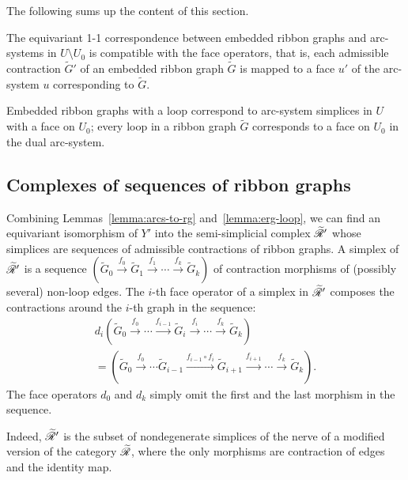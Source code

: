 The following sums up the content of this section.
\begin{lemma}
  \label{lemma:erg-loop}
  The equivariant 1-1 correspondence between embedded ribbon graphs
  and arc-systems in $U \setminus U_0$ is compatible with the face operators,
  that is, each admissible contraction ${\tilde G'}$ of an embedded
  ribbon graph ${\tilde G}$ is mapped to a face $u'$ of the arc-system
  $u$ corresponding to ${\tilde G}$.

  Embedded ribbon graphs with a loop correspond to arc-system simplices
  in $U$ with a face on $U_0$; every loop in a ribbon graph ${\tilde G}$
  corresponds to a face on $U_0$ in the dual arc-system.
\end{lemma}


\subsection{Complexes of sequences of ribbon graphs}
\label{sec:sequences}

Combining Lemmas~\ref{lemma:arcs-to-rg} and~\ref{lemma:erg-loop}, we
can find an equivariant isomorphism of $Y'$ into the semi-simplicial
complex $\mathscr{\widetilde R}_{}'$ whose simplices are sequences of admissible
contractions of ribbon graphs.  A simplex of $\mathscr{\widetilde R}_{}'$ is a sequence
$({\tilde G}_0 \overset{f_0}\to {\tilde G}_1 \overset{f_1}\to \cdots
\overset{f_k}\to {\tilde G}_k)$ of contraction morphisms of (possibly
several) non-loop edges.  The $i$-th face operator of a simplex in
$\mathscr{\widetilde R}_{}'$ composes the contractions around the $i$-th graph in the
sequence:
\begin{multline}
  \label{eq:5}
  d_i({\tilde G}_0 \overset{f_0}\to \cdots \xrightarrow{f_{i-1}} {\tilde
    G}_i \overset{f_i}\to \cdots \overset{f_k}\to {\tilde G}_k) \\
  = ({\tilde G}_0 \overset{f_0}\to \cdots {\tilde
    G}_{i-1} \xrightarrow{f_{i-1} \circ f_i} {\tilde G_{i+1}} 
    \xrightarrow{f_{i+1}} \cdots \overset{f_k}\to {\tilde G}_k).
\end{multline}
The face operators $d_0$ and $d_k$ simply omit the first and the last
morphism in the sequence.

Indeed, $\mathscr{\widetilde R}_{}'$ is the subset of nondegenerate simplices of the nerve
of a modified version of the category $\mathscr{\widetilde R}_{}$, where the only
morphisms are contraction of edges and the identity map.

